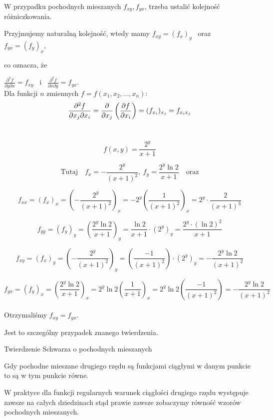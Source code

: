 W przypadku pochodnych mieszanych $ f_{xy}, f_{yx} $, trzeba ustalić kolejność różniczkowania.

Przyjmujemy naturalną kolejność, wtedy mamy $ f_{xy} = (f_x)_y $ \ oraz \ $ f_{yx} = (f_y)_x $,

co oznacza, że 

$ \frac{\partial^2 f}{\partial y \partial x} = f_{xy} $ \ i \ $ \frac{\partial^2 f}{\partial x \partial y} = f_{yx} $. \\

Dla funkcji $n$ zmiennych $ f = f(x_1, x_2, ..., x_n) $:
$$ \frac{\partial^2 f}{\partial x_j \partial x_i} = \frac{\partial }{\partial x_j} \left( \frac{\partial f}{\partial x_i} \right) = (f_{x_i})_{x_j} = f_{x_i x_j} $$ \\

\begin{przyklad}

$$ f(x,y) = \frac{2^y}{x+1} $$

$$ \textrm{Tutaj} \quad  f_x = -\frac{2^y}{(x+1)^2}, \ f_y = \frac{2^y \ln 2}{x+1} \quad \textrm{oraz} $$

$$ f_{xx} = (f_x)_x = \left( - \frac{2^y}{(x+1)^2} \right)_x = -2^y \left( \frac{1}{(x+1)^2} \right)_x = 2^y \cdot \frac{2}{(x+1)^3} $$

$$ f_{yy} = (f_y)_y = \left( \frac{2^y \ln 2}{x+1} \right)_y = \frac{\ln2}{x+1} \cdot (2^y)_y = \frac{2^y \cdot (\ln2)^2}{x+1} $$

$$ f_{xy} = (f_x)_y = \left( - \frac{2^y}{(x+1)^2} \right)_y = \left( \frac{-1}{(x+1)^2} \right) \cdot (2^y)_y = - \frac{2^y \ln2}{(x+1)^2} $$

$$ f_{yx} = (f_y)_x = \left( \frac{2^y \ln2}{x+1} \right)_x = 2^y \ln2 \left( \frac{1}{x+1} \right)_x = 2^y \ln2 \left( \frac{-1}{(x+1)^2} \right) = - \frac{2^y \ln2}{(x+1)^2} $$ \\

Otrzymaliśmy $ f_{xy} = f_{yx} $.

Jest to szczególny przypadek znanego twierdzenia.
\end{przyklad}

\begin{tw}{Twierdzenie Schwarza o pochodnych mieszanych}

Gdy pochodne mieszane drugiego rzędu są funkcjami ciągłymi w danym punkcie to są w tym punkcie równe.

W praktyce dla funkcji regularnych warunek ciągłości drugiego rzędu występuje zawsze na całych dziedzinach
stąd prawie zawsze zobaczymy równość wzorów pochodnych mieszanych.
\end{tw}

